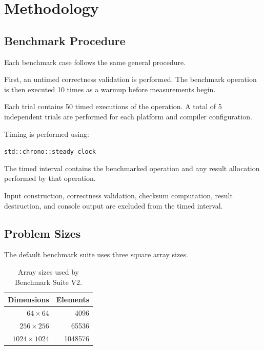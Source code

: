 \documentclass[11pt]{article}
\newcommand{\benchmarkversion}{V2}
\newcommand{\warmups}{10}
\newcommand{\samples}{50}
\newcommand{\trials}{5}
\begin{document}

\section{Methodology}

\subsection{Benchmark Procedure}

Each benchmark case follows the same general procedure.

First, an untimed correctness validation is performed.
The benchmark operation is then executed \warmups{} times as
a warmup before measurements begin.

Each trial contains \samples{} timed executions of the operation.
A total of \trials{} independent trials are performed for each
platform and compiler configuration.

Timing is performed using:

\begin{center}
\texttt{std::chrono::steady\_clock}
\end{center}

The timed interval contains the benchmarked operation and any
result allocation performed by that operation.

Input construction, correctness validation, checksum computation,
result destruction, and console output are excluded from the
timed interval.


\subsection{Problem Sizes}

The default benchmark suite uses three square array sizes.

\begin{table}[H]
    \centering
    \begin{tabular}{rr}
        \toprule
        \textbf{Dimensions} & \textbf{Elements} \\
        \midrule
        $64 \times 64$     & \num{4096} \\
        $256 \times 256$   & \num{65536} \\
        $1024 \times 1024$ & \num{1048576} \\
        \bottomrule
    \end{tabular}
    \caption{Array sizes used by Benchmark Suite \benchmarkversion{}.}
    \label{tab:sizes}
\end{table}
\end{document}

